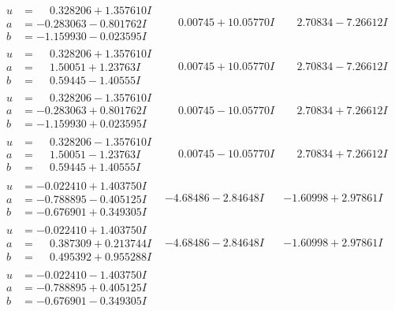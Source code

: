 \documentclass[1p]{elsarticle_modified}
\theoremstyle{definition}
\begin{document}
$$\begin{array}{c|c|c}
\begin{aligned}
u &= \phantom{-}0.328206 + 1.357610 I \\
a &= -0.283063 - 0.801762 I \\
b &= -1.159930 - 0.023595 I\end{aligned}
 & \phantom{-}0.00745 + 10.05770 I & \phantom{-}2.70834 - 7.26612 I \\ \hline\begin{aligned}
u &= \phantom{-}0.328206 + 1.357610 I \\
a &= \phantom{-}1.50051 + 1.23763 I \\
b &= \phantom{-}0.59445 - 1.40555 I\end{aligned}
 & \phantom{-}0.00745 + 10.05770 I & \phantom{-}2.70834 - 7.26612 I \\ \hline\begin{aligned}
u &= \phantom{-}0.328206 - 1.357610 I \\
a &= -0.283063 + 0.801762 I \\
b &= -1.159930 + 0.023595 I\end{aligned}
 & \phantom{-}0.00745 - 10.05770 I & \phantom{-}2.70834 + 7.26612 I \\ \hline\begin{aligned}
u &= \phantom{-}0.328206 - 1.357610 I \\
a &= \phantom{-}1.50051 - 1.23763 I \\
b &= \phantom{-}0.59445 + 1.40555 I\end{aligned}
 & \phantom{-}0.00745 - 10.05770 I & \phantom{-}2.70834 + 7.26612 I \\ \hline\begin{aligned}
u &= -0.022410 + 1.403750 I \\
a &= -0.788895 - 0.405125 I \\
b &= -0.676901 + 0.349305 I\end{aligned}
 & -4.68486 - 2.84648 I & -1.60998 + 2.97861 I \\ \hline\begin{aligned}
u &= -0.022410 + 1.403750 I \\
a &= \phantom{-}0.387309 + 0.213744 I \\
b &= \phantom{-}0.495392 + 0.955288 I\end{aligned}
 & -4.68486 - 2.84648 I & -1.60998 + 2.97861 I \\ \hline\begin{aligned}
u &= -0.022410 - 1.403750 I \\
a &= -0.788895 + 0.405125 I \\
b &= -0.676901 - 0.349305 I\end{aligned}

\end{array}$$
\end{document}
